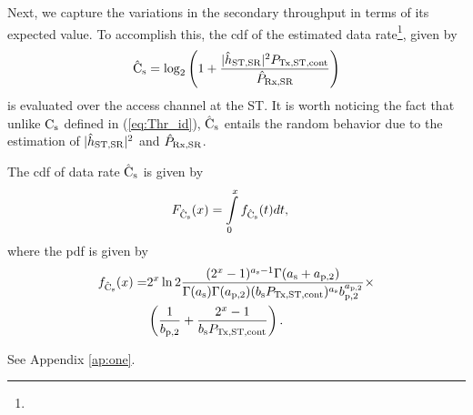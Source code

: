 
Next, we capture the variations in the secondary throughput in terms of its expected value. To accomplish this, the cdf of the estimated data rate\footnote{}, given by  
\begin{align}
\eca  = \log_2 \left(1 + \frac{\epgs \preg}{\eprcvdsr} \right) \label{eq:eca}
\end{align}
is evaluated over the access channel at the ST. It is worth noticing the fact that unlike $\text{C}_{\text{s}}$ defined in (\ref{eq:Thr_id}), $\hat{\text{{C}}}_{\text{s}}$ entails the random behavior due to the estimation of $|\hat{h}_{\text{ST,SR}}|^2$ and $\hat{P}_{\text{Rx,SR}}$.
\begin{lemma} \label{lm:lm5}
\normalfont 
The cdf of data rate $\hat{\text{{C}}}_{\text{s}}$ is given by
\begin{align}
\fc(x) &= \int\limits_{0}^{x} \dc(t) dt, \label{eq:dis_C} 
\end{align}
where the pdf is given by 
\begin{align}
\dc(x) =& 2^x \ln 2 \frac{(2^x - 1)^{\as - 1} \Gamma(\as + \apt)}{\Gamma(\as) \Gamma(\apt) (\bs \preg) ^{\as} \bpt^{\apt}} \times \nonumber \\  & \left(\frac{1}{\bpt} + \frac{2^x - 1}{\bs \preg}\right). \label{eq:den_C}
\end{align}
\end{lemma}
\begin{IEEEproof}
See Appendix \ref{ap:one}.
\end{IEEEproof}

